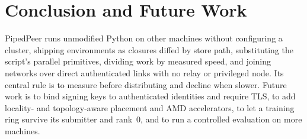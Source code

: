 \documentclass[conference]{IEEEtran}
\begin{document}
\section{Conclusion and Future Work}

PipedPeer runs unmodified Python on other machines without configuring a
cluster, shipping environments as closures diffed by store path, substituting
the script's parallel primitives, dividing work by measured speed, and joining
networks over direct authenticated links with no relay or privileged node. Its
central rule is to measure before distributing and decline when slower. Future work is to bind signing
keys to authenticated identities and require TLS, to add locality- and
topology-aware placement and AMD accelerators, to let a training ring survive
its submitter and rank~0, and to run a controlled evaluation on more machines.
\end{document}
